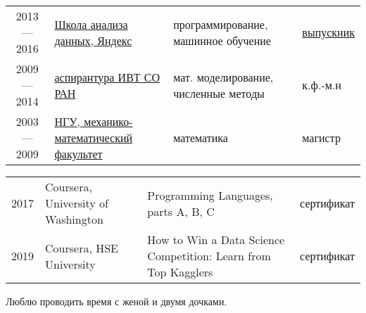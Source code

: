 \documentclass[11pt]{article}
\begin{document}
\vspace{-3.1em}

\begin{longtable} {cp{}p{}l}
2013 — 2016	& \href{https://yandexdataschool.ru}{Школа анализа данных, Яндекс} & программирование, машинное обучение & \href{https://academy.yandex.ru/dataschool/life}{выпускник} \vspace{0.5em}\\
2009 — 2014	& \href{http://www.ict.nsc.ru/ru/education/postgraduate}{аспирантура ИВТ СО РАН} & мат. моделирование, численные методы & к.ф.-м.н \vspace{0.5em}\\
2003 — 2009	& \href{https://www.nsu.ru/n/mathematics-mechanics-department/}{НГУ, механико-математический факультет} & математика & магистр \vspace{0.5em}\\
\end{longtable}

\vspace{-1.5em}

\begin{longtable} {cp{}p{}l}
2017 & Coursera, University of Washington & Programming Languages, parts A, B, C & 	сертификат \vspace{0.5em}\\
2019 & Coursera, HSE University & How to Win a Data Science Competition: Learn from Top Kagglers & сертификат \vspace{0.5em}\\
\end{longtable}

\vspace{-2.0em}


Люблю проводить время с женой и двумя дочками.
\end{document}
